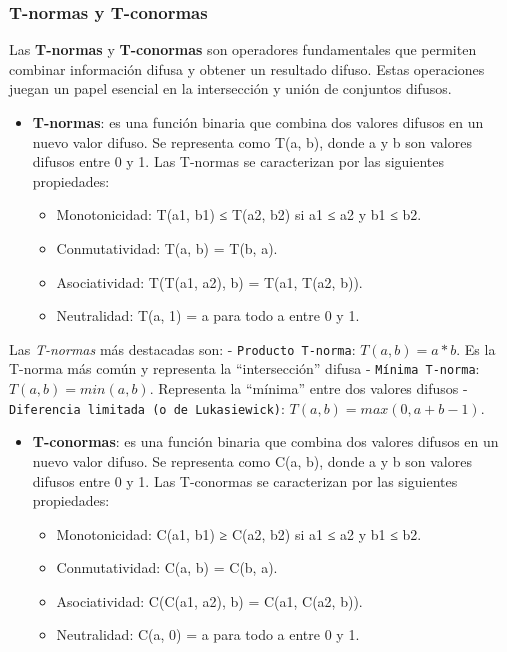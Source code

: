 \documentclass[
  a4paper,
  DIV=11,
  numbers=noendperiod]{scrreprt}
\providecommand{\tightlist}{%
  \setlength{\itemsep}{0pt}\setlength{\parskip}{0pt}}\usepackage{longtable,booktabs,array}
\begin{document}
\subsubsection{T-normas y T-conormas}\label{t-normas-y-t-conormas}

Las \textbf{T-normas} y \textbf{T-conormas} son operadores fundamentales
que permiten combinar información difusa y obtener un resultado difuso.
Estas operaciones juegan un papel esencial en la intersección y unión de
conjuntos difusos.

\begin{itemize}
\tightlist
\item
  \textbf{T-normas}: es una función binaria que combina dos valores
  difusos en un nuevo valor difuso. Se representa como T(a, b), donde a
  y b son valores difusos entre 0 y 1. Las T-normas se caracterizan por
  las siguientes propiedades:

  \begin{itemize}
  \tightlist
  \item
    Monotonicidad: T(a1, b1) ≤ T(a2, b2) si a1 ≤ a2 y b1 ≤ b2.
  \item
    Conmutatividad: T(a, b) = T(b, a).
  \item
    Asociatividad: T(T(a1, a2), b) = T(a1, T(a2, b)).
  \item
    Neutralidad: T(a, 1) = a para todo a entre 0 y 1.
  \end{itemize}
\end{itemize}

Las \emph{T-normas} más destacadas son: - \texttt{Producto\ T-norma}:
\(T(a, b) = a * b\). Es la T-norma más común y representa la
``intersección'' difusa - \texttt{Mínima\ T-norma}:
\(T(a, b) = min(a, b)\). Representa la ``mínima'' entre dos valores
difusos - \texttt{Diferencia\ limitada\ (o\ de\ Lukasiewick)}:
\(T(a, b) = max(0, a + b - 1)\).

\begin{itemize}
\tightlist
\item
  \textbf{T-conormas}: es una función binaria que combina dos valores
  difusos en un nuevo valor difuso. Se representa como C(a, b), donde a
  y b son valores difusos entre 0 y 1. Las T-conormas se caracterizan
  por las siguientes propiedades:

  \begin{itemize}
  \tightlist
  \item
    Monotonicidad: C(a1, b1) ≥ C(a2, b2) si a1 ≤ a2 y b1 ≤ b2.
  \item
    Conmutatividad: C(a, b) = C(b, a).
  \item
    Asociatividad: C(C(a1, a2), b) = C(a1, C(a2, b)).
  \item
    Neutralidad: C(a, 0) = a para todo a entre 0 y 1.
  \end{itemize}
\end{itemize}
\end{document}
